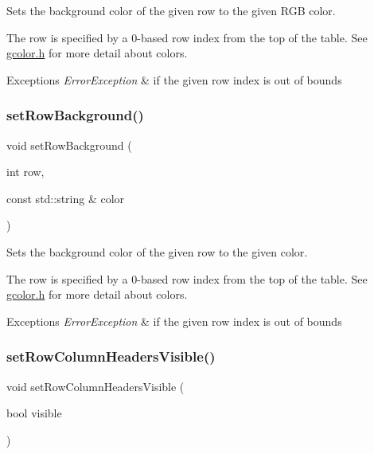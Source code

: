 Sets the background color of the given row to the given R\+GB color. 

The row is specified by a 0-\/based row index from the top of the table. See \mbox{\hyperlink{gcolor_8h_source}{gcolor.\+h}} for more detail about colors. 
\begin{DoxyExceptions}{Exceptions}
{\em Error\+Exception} & if the given row index is out of bounds \\
\hline
\end{DoxyExceptions}
\mbox{\label{classGTable_a30c7073dfeac833056ed65a8bb9a7e08}} 
\subsubsection{\texorpdfstring{set\+Row\+Background()}{setRowBackground()}\hspace{0.1cm}{\footnotesize\ttfamily [2/2]}}
{\footnotesize\ttfamily void set\+Row\+Background (\begin{DoxyParamCaption}\item[{int}]{row,  }\item[{const std\+::string \&}]{color }\end{DoxyParamCaption})\hspace{0.3cm}{\ttfamily [virtual]}}



Sets the background color of the given row to the given color. 

The row is specified by a 0-\/based row index from the top of the table. See \mbox{\hyperlink{gcolor_8h_source}{gcolor.\+h}} for more detail about colors. 
\begin{DoxyExceptions}{Exceptions}
{\em Error\+Exception} & if the given row index is out of bounds \\
\hline
\end{DoxyExceptions}
\mbox{\label{classGTable_a0d4a1d2a58daff8c1984e31b21f93ea1}} 
\subsubsection{\texorpdfstring{set\+Row\+Column\+Headers\+Visible()}{setRowColumnHeadersVisible()}}
{\footnotesize\ttfamily void set\+Row\+Column\+Headers\+Visible (\begin{DoxyParamCaption}\item[{bool}]{visible }\end{DoxyParamCaption})\hspace{0.3cm}{\ttfamily [virtual]}}



